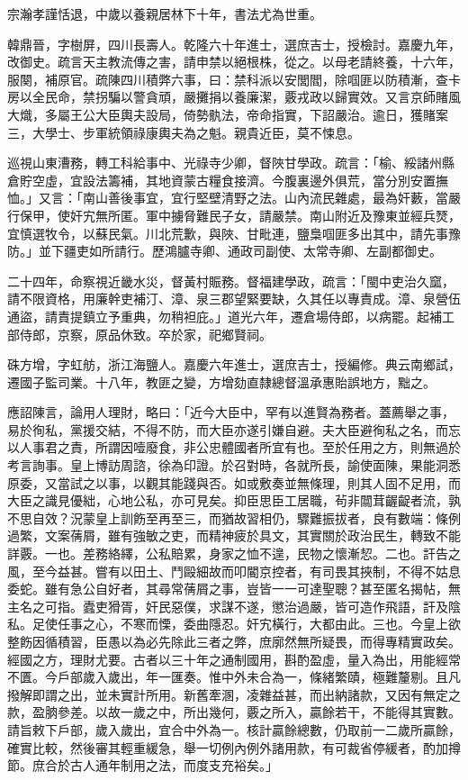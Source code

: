 \begin{pinyinscope}
宗瀚孝謹恬退，中歲以養親居林下十年，書法尤為世重。

韓鼎晉，字樹屏，四川長壽人。乾隆六十年進士，選庶吉士，授檢討。嘉慶九年，改御史。疏言天主教流傳之害，請申禁以絕根株，從之。以母老請終養，十六年，服闋，補原官。疏陳四川積弊六事，曰：禁科派以安閭閻，除啯匪以防積漸，查卡房以全民命，禁拐騙以警貪頑，嚴攤捐以養廉潔，覈戎政以歸實效。又言京師賭風大熾，多屬王公大臣輿夫設局，倚勢骫法，帝命指實，下詔嚴治。逾日，獲賭案三，大學士、步軍統領祿康輿夫為之魁。親貴近臣，莫不悚息。

巡視山東漕務，轉工科給事中、光祿寺少卿，督陜甘學政。疏言：「榆、綏諸州縣倉貯空虛，宜設法籌補，其地資蒙古糧食接濟。今腹裏邊外俱荒，當分別安置撫恤。」又言：「南山善後事宜，宜行堅壁清野之法。山內流民雜處，最為奸藪，當嚴行保甲，使奸宄無所匿。軍中擄脅難民子女，請嚴禁。南山附近及豫東並經兵燹，宜慎選牧令，以蘇民氣。川北荒歉，與陜、甘毗連，鹽梟啯匪多出其中，請先事豫防。」並下疆吏如所請行。歷鴻臚寺卿、通政司副使、太常寺卿、左副都御史。

二十四年，命察視近畿水災，督黃村賑務。督福建學政，疏言：「閩中吏治久窳，請不限資格，用廉幹吏補汀、漳、泉三郡望緊要缺，久其任以專責成。漳、泉營伍通盜，請責提鎮立予重典，勿稍袒庇。」道光六年，遷倉場侍郎，以病罷。起補工部侍郎，京察，原品休致。卒於家，祀鄉賢祠。

硃方增，字虹舫，浙江海鹽人。嘉慶六年進士，選庶吉士，授編修。典云南鄉試，遷國子監司業。十八年，教匪之變，方增劾直隸總督溫承惠貽誤地方，黜之。

應詔陳言，論用人理財，略曰：「近今大臣中，罕有以進賢為務者。蓋薦舉之事，易於徇私，黨援交結，不得不防，而大臣亦遂引嫌自避。夫大臣避徇私之名，而忘以人事君之責，所謂因噎廢食，非公忠體國者所宜有也。至於任用之方，則無過於考言詢事。皇上博訪周諮，徐為印證。於召對時，各就所長，諭使面陳，果能洞悉原委，又當試之以事，以觀其能踐與否。如或敷奏並無條理，則其人固不足用，而大臣之識見優絀，心地公私，亦可見矣。抑臣思臣工居職，茍非闒茸齷齪者流，孰不思自效？況蒙皇上訓飭至再至三，而猶故習相仍，驟難振拔者，良有數端：條例過繁，文案蒨屑，雖有強敏之吏，而精神疲於具文，其實關於政治民生，轉致不能詳覈。一也。差務絡繹，公私賠累，身家之恤不遑，民物之懷漸恝。二也。訐告之風，至今益甚。嘗有以田土、鬥毆細故而叩閽京控者，有司畏其挾制，不得不姑息委蛇。雖有急公自好者，其尋常蒨屑之事，豈皆一一可達聖聰？甚至匿名揭帖，無主名之可指。蠹吏猾胥，奸民惡僕，求謀不遂，懲治過嚴，皆可造作飛語，訐及陰私。足使任事之心，不寒而慄，委曲隱忍。奸宄橫行，大都由此。三也。今皇上欲整飭因循積習，臣愚以為必先除此三者之弊，庶廓然無所疑畏，而得專精實政矣。經國之方，理財尤要。古者以三十年之通制國用，斟酌盈虛，量入為出，用能經常不匱。今戶部歲入歲出，年一匯奏。惟中外未合為一，條緒繁賾，極難釐剔。且凡撥解即謂之出，並未實計所用。新舊牽溷，凌雜益甚，而出納諸款，又因有無定之款，盈朒參差。以故一歲之中，所出幾何，覈之所入，贏餘若干，不能得其實數。請旨敕下戶部，歲入歲出，宜合中外為一。核計贏餘總數，仍取前一二歲所贏餘，確實比較，然後審其輕重緩急，舉一切例內例外諸用款，有可裁省停緩者，酌加撙節。庶合於古人通年制用之法，而度支充裕矣。」


\end{pinyinscope}

